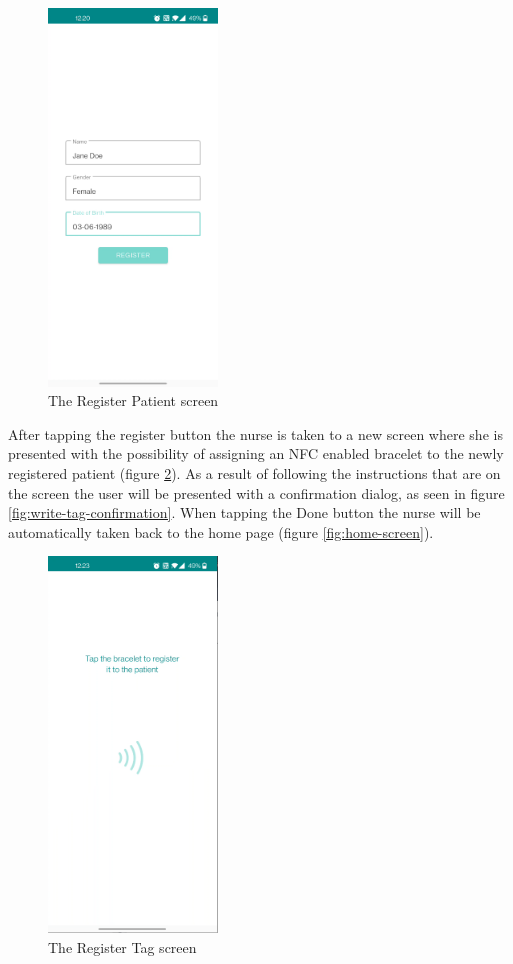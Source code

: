 \begin{figure}
\centering
\includegraphics[width=0.4\textwidth]{figures/register_patient_screen.png}
\caption{The Register Patient screen}
\label{fig:register-patient-screen}
\end{figure}

After tapping the register button the nurse is taken to a new screen where she is presented with the possibility of assigning an NFC enabled bracelet to the newly registered patient (figure \ref{fig:write-tag-screen}). As a result of following the instructions that are on the screen the user will be presented with a confirmation dialog, as seen in figure \ref{fig:write-tag-confirmation}. When tapping the Done button the nurse will be automatically taken back to the home page (figure \ref{fig:home-screen}).

\begin{figure}
\centering
\includegraphics[width=0.4\textwidth]{figures/write_tag_screen.png}
\caption{The Register Tag screen}
\label{fig:write-tag-screen}
\end{figure}

